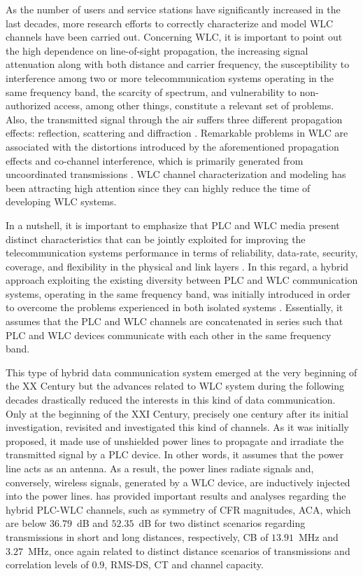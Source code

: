 \documentclass[journal]{IEEEtran}
\begin{document}
As the number of users and service stations have significantly increased in the last decades, more research efforts to correctly characterize and model \ac{WLC} channels have been carried out. Concerning \ac{WLC}, it is important to point out the high dependence on line-of-sight propagation, the increasing signal attenuation along with both distance and carrier frequency, the susceptibility to interference among two or more telecommunication systems operating in the same frequency band, the scarcity of spectrum, and vulnerability to non-authorized access, among other things, constitute a relevant set of problems. Also, the transmitted signal through the air suffers three different propagation effects: reflection, scattering and diffraction \cite{Guze}. Remarkable problems in \ac{WLC} are associated with the distortions introduced by the aforementioned propagation effects and co-channel interference, which is primarily generated from uncoordinated transmissions \cite{Sayed2015}. \ac{WLC} channel characterization and modeling has been attracting high attention since they can highly reduce the time of developing \ac{WLC} systems. 

In a nutshell, it is important to emphasize that \ac{PLC} and \ac{WLC} media present distinct characteristics that can be jointly exploited for improving the telecommunication systems performance in terms of reliability, data-rate, security, coverage, and flexibility in the physical and link layers \cite{Dib,Victor2017,Victor2018}. In this regard, a hybrid approach exploiting the existing diversity between \ac{PLC} and \ac{WLC} communication systems, operating in the same frequency band, was initially introduced in order to overcome the problems experienced in both isolated systems \cite{thiago:hyb, thiago:hyb2, Victor2016, Leo2016}. Essentially, it assumes that the \ac{PLC} and \ac{WLC} channels are concatenated in series such that \ac{PLC} and \ac{WLC} devices communicate with each other in the same frequency band. 

This type of hybrid data communication system emerged at the very beginning of the XX Century \cite{Mischa} but the advances related to \ac{WLC} system during the following decades drastically reduced the interests in this kind of data communication. Only at the beginning of the XXI Century, precisely one century after its initial investigation, \cite{thiago:hyb} revisited and investigated this kind of channels. As it was initially proposed, it made use of unshielded power lines to propagate and irradiate the transmitted signal by a \ac{PLC} device. In other words, it assumes that the power line acts as an antenna. As a result, the power lines radiate signals and, conversely, wireless signals, generated by a \ac{WLC} device, are inductively injected into the power lines. \cite{thiago:hyb} has provided important results and analyses regarding the hybrid \ac{PLC}-\ac{WLC} channels, such as symmetry of \ac{CFR} magnitudes, \ac{ACA}, which are below $36.79$~dB and $52.35$~dB for two distinct scenarios regarding transmissions in short and long distances, respectively, \ac{CB} of $13.91$~MHz and $3.27$~MHz, once again related to distinct distance scenarios of transmissions and correlation levels of $0.9$, \ac{RMS-DS}, \ac{CT} and channel capacity.
\end{document}
